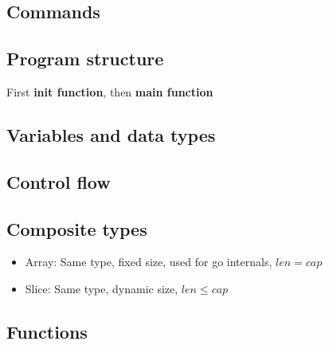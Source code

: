 \documentclass[../../main.tex]{subfiles}
\begin{document}
\subsection{Commands}


\subsection{Program structure}
First \textbf{init function}, then \textbf{main function}


\subsection{Variables and data types}


\subsection{Control flow}


\subsection{Composite types}
\begin{itemize}
    \item Array: Same type, fixed size, used for go internals, $len = cap$
    \item Slice: Same type, dynamic size, $len \le cap$
\end{itemize}


\subsection{Functions}

\end{document}
